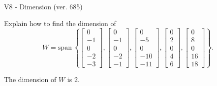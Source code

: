 \begin{exercise}
  \begin{exerciseTitle}V8 - Dimension (ver. 685)\end{exerciseTitle}
  \begin{exerciseStatement}
    Explain how to find the dimension of 
\[W=\mathrm{span}\ \left\{\left[\begin{array}{r}
0 \\
-1 \\
0 \\
-2 \\
-3
\end{array}\right] , \left[\begin{array}{r}
0 \\
-1 \\
0 \\
-2 \\
-1
\end{array}\right] , \left[\begin{array}{r}
0 \\
-5 \\
0 \\
-10 \\
-11
\end{array}\right] , \left[\begin{array}{r}
0 \\
2 \\
0 \\
4 \\
6
\end{array}\right] , \left[\begin{array}{r}
0 \\
8 \\
0 \\
16 \\
18
\end{array}\right]\right\}.\]



  \end{exerciseStatement}
  \begin{exerciseAnswer}
   The dimension of \(W\) is  \(2\).
  


  \end{exerciseAnswer}
\end{exercise}